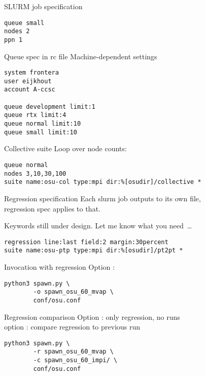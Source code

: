 \begin{numberedframe}{SLURM job specification}
\begin{verbatim}
queue small
nodes 2
ppn 1
\end{verbatim}
\end{numberedframe}

\begin{numberedframe}{Queue spec in rc file}
  Machine-dependent settings
\begin{verbatim}
system frontera
user eijkhout
account A-ccsc

queue development limit:1
queue rtx limit:4
queue normal limit:10
queue small limit:10  
\end{verbatim}
\end{numberedframe}

\begin{numberedframe}{Collective suite}
Loop over node counts:
\begin{verbatim}
queue normal
nodes 3,10,30,100
suite name:osu-col type:mpi dir:%[osudir]/collective *
\end{verbatim}
\end{numberedframe}

\begin{numberedframe}{Regression specification}
  Each slurm job outputs to its own file,\\
  regression spec applies to that.

  Keywords still under design. Let me know what you need~\ldots
\begin{verbatim}
regression line:last field:2 margin:30percent
suite name:osu-ptp type:mpi dir:%[osudir]/pt2pt *
\end{verbatim}
\end{numberedframe}

\begin{numberedframe}{Invocation with regression}
  Option :
\begin{verbatim}
python3 spawn.py \
        -o spawn_osu_60_mvap \
        conf/osu.conf
\end{verbatim}
\end{numberedframe}

\begin{numberedframe}{Regression comparison}
  Option : only regression, no runs\\
  option \n{-c prevdir}: compare regression to previous run
\begin{verbatim}
python3 spawn.py \
        -r spawn_osu_60_mvap \
        -c spawn_osu_60_impi/ \
        conf/osu.conf
\end{verbatim}
\end{numberedframe}

